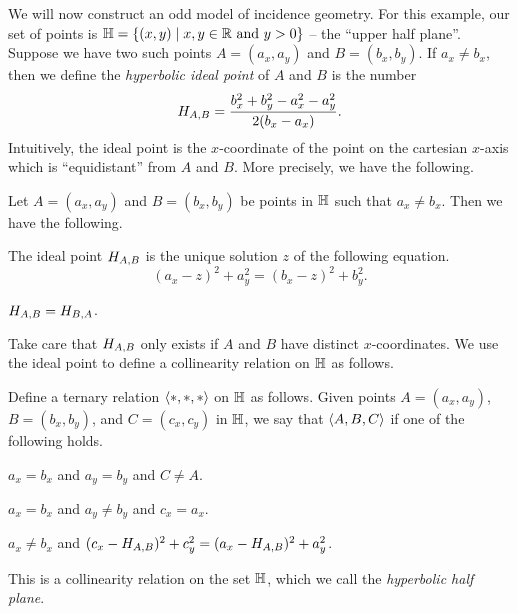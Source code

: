 We will now construct an odd model of incidence geometry.
For this example, our set of points is \(\mathbb{H} = \{ (x,y) \mid x,y \in \mathbb{R}\ \mathrm{and}\ y > 0 \}\) -- the ``upper half plane''.
Suppose we have two such points \(A = (a_x, a_y)\) and \(B = (b_x, b_y)\).
If \(a_x \neq b_x\), then we define the \emph{hyperbolic ideal point} of \(A\) and \(B\) is the number \[ H_{A,B} = \frac{b_x^2 + b_y^2 - a_x^2 - a_y^2}{2(b_x - a_x)}. \]
Intuitively, the ideal point is the \(x\)-coordinate of the point on the cartesian \(x\)-axis which is ``equidistant'' from \(A\) and \(B\).
More precisely, we have the following.

\begin{lem}\label{lem:hhp-ip-sol}
Let \(A = (a_x, a_y)\) and \(B = (b_x, b_y)\) be points in \(\mathbb{H}\) such that \(a_x \neq b_x\).
Then we have the following.
\begin{proplist}
\item \label{lem:hhp-ip-sol:uniq} The ideal point \(H_{A,B}\) is the unique solution \(z\) of the following equation.
\[ (a_x - z)^2 + a_y^2 = (b_x - z)^2 + b_y^2. \]
\item \label{lem:hhp-ip-sol:sym} \(H_{A,B} = H_{B,A}\).
\end{proplist}
\end{lem}

Take care that \(H_{A,B}\) only exists if \(A\) and \(B\) have distinct \(x\)-coordinates.
We use the ideal point to define a collinearity relation on \(\mathbb{H}\) as follows.

\begin{prop}\label{prop:hyp-half-plane}
Define a ternary relation \(\langle \ast, \ast, \ast \rangle\) on \(\mathbb{H}\) as follows.
Given points \(A = (a_x, a_y)\), \(B = (b_x, b_y)\), and \(C = (c_x, c_y)\) in \(\mathbb{H}\), we say that \(\langle A, B, C \rangle\) if one of the following holds.
\begin{proplist}
\item \(a_x = b_x\) and \(a_y = b_y\) and \(C \neq A\).
\item \(a_x = b_x\) and \(a_y \neq b_y\) and \(c_x = a_x\).
\item \(a_x \neq b_x\) and \( (c_x - H_{A,B})^2 + c_y^2 = (a_x - H_{A,B})^2 + a_y^2 \).
\end{proplist}
This is a collinearity relation on the set \(\mathbb{H}\), which we call the \emph{hyperbolic half plane}.
\end{prop}

